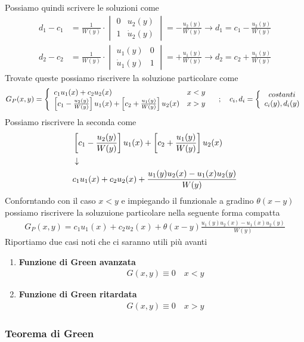 Possiamo quindi scrivere le soluzioni come
\begin{align}
d_1 - c_1 &= \frac{1}{W(y)} \cdot \begin{vmatrix}
			0 & u_2(y) \\
			1 & \dot{u}_2(y)
	\end{vmatrix} = -\frac{u_2(y)}{W(y)} \to d_1 = c_1  -\frac{u_2(y)}{W(y)}\\
d_2 - c_2 &= \frac{1}{W(y)} \cdot \begin{vmatrix}
	u_1(y) & 0\\
	\dot{u}_1(y) & 1
\end{vmatrix} = +\frac{u_1(y)}{W(y)} \to d_2 = c_2 +\frac{u_1(y)}{W(y)}
\end{align}
Trovate queste possiamo riscrivere la soluzione particolare come
\begin{align}
	G_P(x,y) = \double{c_1 u_1 (x) + c_2 u_2 (x) \hfill x<y}{\left[  c_1  -\frac{u_2(y)}{W(y)} \right] u_1 (x) + \left[ c_2 +\frac{u_1(y)}{W(y)} \right] u_2 (x) \quad x>y} \spacer c_i,d_i = \double{costanti}{c_i(y), d_i(y)}
\end{align}
Possiamo riscrivere la seconda come
\begin{align}
&\left[  c_1  -\frac{u_2(y)}{W(y)} \right] u_1 (x) + \left[ c_2 +\frac{u_1(y)}{W(y)} \right] u_2 (x)\\ &\downarrow \nonumber \\
&c_1 u_1 (x) + c_2 u_2 (x) + \frac{u_1(y)u_2(x) - u_1(x)u_2(y)}{W(y)}
\end{align}
Conforntando con il caso $x<y$ e impiegando il funzionale a gradino $\theta(x-y)$ possiamo riscrivere la soluzuione particolare nella seguente forma compatta
\begin{align}
	G_P(x,y)= c_1 u_1 (x) + c_2 u_2 (x) + \theta(x-y) \frac{u_1(y)u_2(x) - u_1(x)u_2(y)}{W(y)}
\end{align}
Riportiamo due casi noti che ci saranno utili più avanti
\begin{enumerate}
	\item \textbf{Funzione di Green avanzata}
		\begin{align}
			&G(x,y) \equiv 0 \quad x<y 
		\end{align}
	\item \textbf{Funzione di Green ritardata}
		\begin{align}
			&G(x,y) \equiv 0 \quad x>y 
		\end{align}
\end{enumerate}
\newpage

\subsubsection{Teorema di Green}

